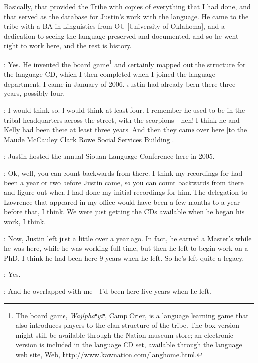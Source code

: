 \documentclass[output=paper]{LSP/langsci}
\begin{document}
Basically, that provided the Tribe with copies of everything that I had done, and that served as the database for Justin's work with the language. He came to the tribe with a BA in Linguistics from OU [University of Oklahoma], and a dedication to seeing the language preserved and documented, and so he went right to work here, and the rest is history.

: Yes. He invented the board game\footnote{The board game, \textit{Waj\'iphaⁿyiⁿ}, Camp Crier, is a  language learning game that also introduces players to the clan structure of the  tribe. The box version might still be available through the  Nation museum store; an electronic version is included in the  language CD set, available through the  language web site, Web, {http://www.kawnation.com/langhome.html}.} and certainly mapped out the structure for the language CD, which I then completed when I joined the language department. I came in January of 2006. Justin had already been there three years, possibly four.

: I would think so. I would think at least four. I remember he used to be in the tribal headquarters across the street, with the scorpions---heh! I think he and Kelly had been there at least three years. And then they came over here [to the Maude McCauley Clark Rowe Social Services Building].

: Justin hosted the annual Siouan Language Conference here in 2005. 

: Ok, well, you can count backwards from there. I think my recordings for  had been a year or two before Justin came, so you can count backwards from there and figure out when I had done my initial recordings for him. The delegation to Lawrence that appeared in my office would have been a few months to a year before that, I think. We were just getting the CDs available when he began his work, I think.

: Now, Justin left just a little over a year ago. In fact, he earned a Master's while he was here, while he was working full time, but then he left to begin work on a PhD. I think he had been here 9 years when he left. So he's left quite a legacy.

: Yes.

: And he overlapped with me---I'd been here five years when he left.
\end{document}
